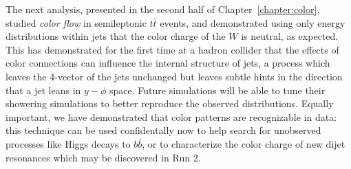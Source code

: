 The next analysis, presented in the second half of Chapter~\ref{chapter:color}, studied \textit{color flow} in semileptonic $t\bar{t}$ events, and demonstrated using only energy distributions within jets that the color charge of the $W$ is neutral, as expected. This has demonstrated for the first time at a hadron collider that the effects of color connections can influence the internal structure of jets, a process which leaves the 4-vector of the jets unchanged but leaves subtle hints in the direction that a jet leans in $y-\phi$ space. Future simulations will be able to tune their showering simulations to better reproduce the observed distributions.  Equally important, we have demonstrated that color patterns are recognizable in data: this technique can be used confidentally now to help search for unobserved processes like Higgs decays to $b\bar{b}$, or to characterize the color charge of new dijet resonances which may be discovered in Run 2. %

